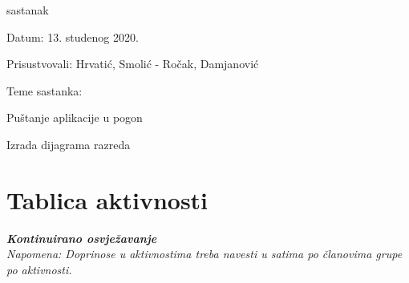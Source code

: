 \begin{packed_enum}
			\item sastanak
			
			\item[] \begin{packed_item}
				\item Datum: 13. studenog 2020.
				\item Prisustvovali: Hrvatić, Smolić - Ročak, Damjanović
				\item Teme sastanka:
				\begin{packed_item}
					\item  Puštanje aplikacije u pogon
					\item  Izrada dijagrama razreda
				\end{packed_item}
			\end{packed_item}
			
			
			
			
			
		\end{packed_enum}
		
		\eject
		\section*{Tablica aktivnosti}
		
			\textbf{\textit{Kontinuirano osvježavanje}}\\
			
			 \textit{Napomena: Doprinose u aktivnostima treba navesti u satima po članovima grupe po aktivnosti.}
					
						
			
